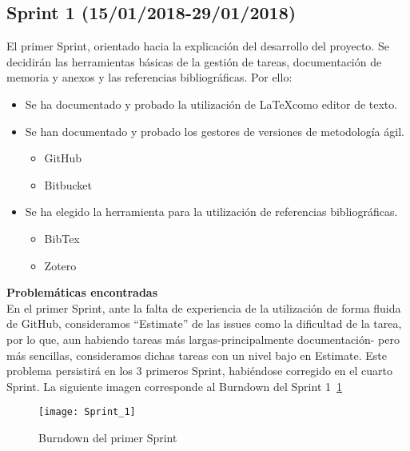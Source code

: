 \subsection{\textbf{Sprint 1}  (15/01/2018-29/01/2018) }
El primer Sprint, orientado hacia la explicación del desarrollo del proyecto. Se decidirán las herramientas básicas de la gestión de tareas, documentación de memoria y anexos y las referencias bibliográficas. 
Por ello: 
\begin{itemize}
\item Se ha documentado y probado la utilización de \LaTeX como editor de texto.
\item Se han documentado y probado los gestores de versiones de metodología ágil. 
\begin{itemize}
\item GitHub
\item Bitbucket
\end{itemize}
\item Se ha elegido la herramienta para la utilización de referencias bibliográficas. 
\begin{itemize}
\item BibTex
\item Zotero
\end{itemize}
\end{itemize}
\textbf{Problemáticas encontradas}\\En el primer Sprint, ante la falta de experiencia de la utilización de forma fluida de GitHub, consideramos ``Estimate'' de las issues como la dificultad de la tarea, por lo que, aun habiendo tareas más largas-principalmente documentación- pero más sencillas, consideramos dichas tareas con un nivel bajo en Estimate. Este problema persistirá en los 3 primeros Sprint, habiéndose corregido en el cuarto Sprint. La siguiente imagen corresponde al Burndown del Sprint 1~\ref{fig:A.2.1}
\begin{figure}[h]
\centering
\texttt{[image: Sprint\_1]}
\caption{Burndown del primer Sprint}
\label{fig:A.2.1}
\end{figure}

